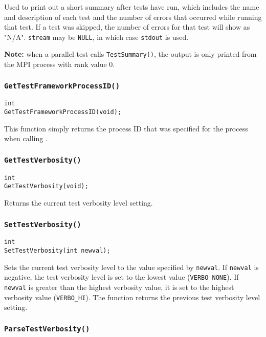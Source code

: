 \documentclass[../HDF5_RFC.tex]{subfiles}
\begin{document}
Used to print out a short summary after tests have run, which includes the name and description of
each test and the number of errors that occurred while running that test. If a test was skipped, the
number of errors for that test will show as "N/A". \texttt{stream} may be \texttt{NULL}, in which case
\texttt{stdout} is used.

\textbf{Note:} when a parallel test calls \texttt{TestSummary()}, the output is only printed from the
MPI process with rank value 0.

\subsubsection{\texttt{GetTestFrameworkProcessID()}}

\begin{verbatim}
int
GetTestFrameworkProcessID(void);
\end{verbatim}

This function simply returns the process ID that was specified for the process when calling
.

\subsubsection{\texttt{GetTestVerbosity()}}

\begin{verbatim}
int
GetTestVerbosity(void);
\end{verbatim}

Returns the current test verbosity level setting.

\subsubsection{\texttt{SetTestVerbosity()}}

\begin{verbatim}
int
SetTestVerbosity(int newval);
\end{verbatim}

Sets the current test verbosity level to the value specified by \texttt{newval}. If \texttt{newval} is negative, the test verbosity level is set to the lowest value (\texttt{VERBO\_NONE}). If \texttt{newval}
is greater than the highest verbosity value, it is set to the highest verbosity value (\texttt{VERBO\_HI}). The function returns the previous test verbosity level setting.

\subsubsection{\texttt{ParseTestVerbosity()}}
\end{document}
